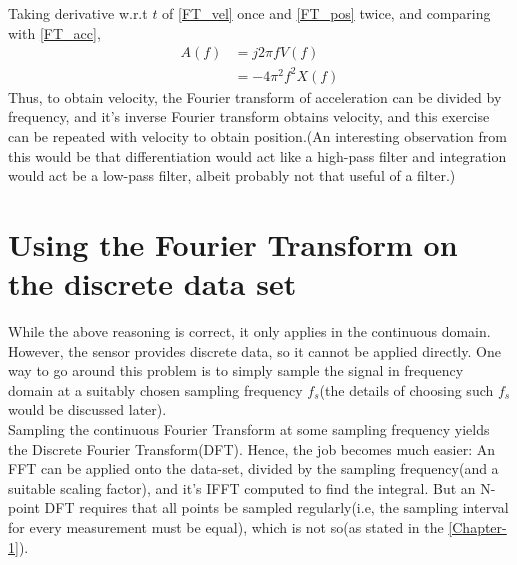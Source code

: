 \documentclass[oneside]{book}
\begin{document}
Taking derivative w.r.t $t$ of \eqref{FT_vel} once and \eqref{FT_pos} twice, and comparing with \eqref{FT_acc},
\begin{align}
    A(f) &= j2 \pi f  V(f)\\
    &= -4 \pi^2 f^2  X(f)
\end{align}
Thus, to obtain velocity, the Fourier transform of acceleration can be divided by frequency, and it's inverse Fourier transform obtains velocity, and this exercise can be repeated with velocity to obtain position.(An interesting observation from this would be that differentiation would act like a high-pass filter and integration would act be a low-pass filter, albeit probably not that useful of a filter.)\\
\newpage
\chapter{Using the Fourier Transform on the discrete data set}
While the above reasoning is correct, it only applies in the continuous domain. However, the sensor provides discrete data, so it cannot be applied directly. One way to go around this problem is to simply sample the signal in frequency domain at a suitably chosen sampling frequency $f_s$(the details of choosing such $f_s$ would be discussed later). \\
Sampling the continuous Fourier Transform at some sampling frequency yields the Discrete Fourier Transform(DFT). Hence, the job becomes much easier: An FFT can be applied onto the data-set, divided by the sampling frequency(and a suitable scaling factor), and it's IFFT computed to find the integral. But an N-point DFT requires that all points be sampled regularly(i.e, the sampling interval for every measurement must be equal), which is not so(as stated in the \autoref{Chapter-1}).
\end{document}
